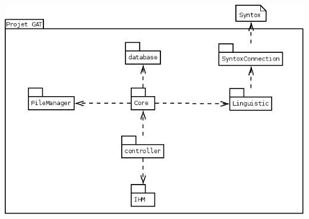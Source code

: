 \documentclass[12pt]{report}
\begin{document}
\includegraphics[scale=0.5]{diversuml/DiagPackagesOpti.png}



\end{document}
